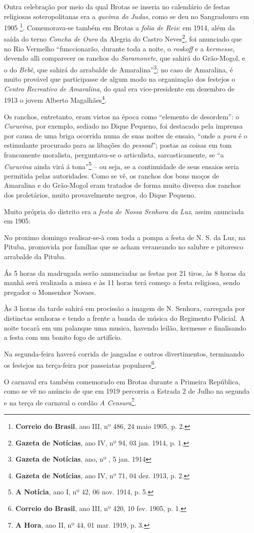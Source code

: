 Outra celebração por meio da qual Brotas se inseria no calendário de festas religiosas soteropolitanas era a \textit{queima do Judas}, como se deu no Sangradouro em 1905 \footnote{\textbf{Correio do Brasil}, ano III, nº 486, 24 maio 1905, p. 2.}. Comemorava-se também em Brotas a \textit{folia de Reis}: em 1914, além da saída do terno \textit{Concha de Ouro} da Alegria do Castro Neves\footnote{\textbf{Gazeta de Notícias}, ano IV, nº 94, 03 jan. 1914, p. 1.}, foi anunciado que no Rio Vermelho ``funccionarão, durante toda a noite, o \textit{roskoff} e a \textit{kermesse}, devendo alli comparecer os ranchos do \textit{Saramonete}, que sahirá do Grão-Mogol, e o do \textit{Bebê}, que sahirá do arrabalde de Amaralina''\footnote{\textbf{Gazeta de Notícias}, ano, nº , 5 jan. 1914}; no caso de Amaralina, é muito provável que participasse de algum modo na organização dos festejos o \textit{Centro Recreativo de Amaralina}, do qual era vice-presidente em dezembro de 1913 o jovem Alberto Magalhães\footnote{\textbf{Gazeta de Notícias}, ano IV, nº 71, 04 dez. 1913, p. 2.}.

Os ranchos, entretanto, eram vistos na época como ``elemento de desordem'': o \textit{Curuvina}, por exemplo, sediado no Dique Pequeno, foi destacado pela imprensa por causa de uma briga ocorrida numa de suas noites de ensaio, ``onde a \textit{pura} é o estimulante procurado para as libações do \textit{pessoal}''; postas as coisas em tom francamente moralista, perguntava-se o articulista, sarcasticamente, se ``a \textit{Curuvina} ainda virá á tona''\footnote{\textbf{A Notícia}, ano I, nº 42, 06 nov. 1914, p. 5.} -- ou seja, se a continuidade de seus ensaios seria permitida pelas autoridades. Como se vê, os ranchos dos bons moços de Amaralina e do Grão-Mogol eram tratados de forma muito diversa dos ranchos dos proletários, muito provavelmente negros, do Dique Pequeno.

Muito própria do distrito era a \textit{festa de Nossa Senhora da Luz}, assim anunciada em 1905:

\begin{citacao}
No proximo domingo realisar-se-à com toda a pompa a festa de N. S. da Luz, na Pituba, promovida por famílias que se acham veraneando no salubre e pitoresco arrabalde da Pituba.

Ás 5 horas da madrugada serão annunciadas as festas por 21 tiros, às 8 horas da manhã será realizada a missa e às 11 horas terá começo a festa religiosa, sendo pregador o Monsenhor Novaes.

Às 3 horas da tarde sahirá em procissão a imagem de N. Senhora, carregada por distinctas senhoras e tendo a frente a banda de música do Regimento Policial. A noite tocarà em um palanque uma musica, havendo leilão, kermesse e finalisando a festa com um bonito fogo de artifício.

Na segunda-feira haverá corrida de jangadas e outros divertimentos, terminando os festejos na terça-feira por passeiatas populares\footnote{\textbf{Correio do Brasil}, ano III, nº 420, 10 fev. 1905, p. 1.}.
\end{citacao}

O carnaval era também comemorado em Brotas durante a Primeira República, como se vê no anúncio de que em 1919 percorria a Estrada 2 de Julho na segunda e na terça de carnaval o cordão \textit{A Censura}\footnote{\textbf{A Hora}, ano II, nº 44, 01 mar. 1919, p. 3.}.